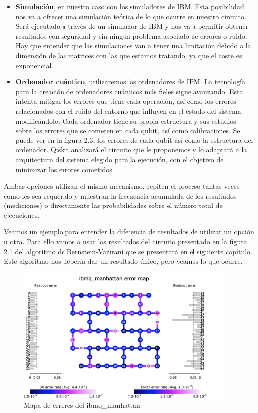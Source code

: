  \begin{itemize}
     \item \textbf{Simulación}, en nuestro caso con los simuladores de IBM. Esta posibilidad nos va a ofrecer una simulación teórica de lo que ocurre en nuestro circuito. Será ejecutado a través de un simulador de IBM y nos va a permitir obtener resultados con seguridad y sin ningún problema asociado de errores o ruido. Hay que entender que las simulaciones van a tener una limitación debido a la dimensión de las matrices con las que estamos tratando, ya que el coste es exponencial.
     
     \item \textbf{Ordenador cuántico}, utilizaremos los ordenadores de IBM. La tecnología para la creación de ordenadores cuánticos más fieles sigue avanzando. Esta intenta mitigar los errores que tiene cada operación, así como los errores relacionados con el ruido del entorno que influyen en el estado del sistema modificándolo. Cada ordenador tiene su propia estructura y sus estudios sobre los errores que se cometen en cada qubit, así como calibraciones. Se puede ver en la figura 2.3, los errores de cada qubit así como la estructura del ordenador. Qiskit analizará el circuito que le proponemos y lo adaptará a la arquitectura del sistema elegido para la ejecución, con el objetivo de minimizar los errores cometidos.
     
 \end{itemize}


 Ambas opciones utilizan el mismo mecanismo, repiten el proceso tantas veces como les sea requerido y muestran la frecuencia acumulada de los resultados (mediciones) o directamente las probabilidades sobre el número total de ejecuciones. \newline

 Veamos un ejemplo para entender la diferencia de resultados de utilizar un opción u otra. Para ello vamos a usar los resultados del circuito presentado en la figura 2.1 del algoritmo de Bernstein-Vazirani que se presentará en el siguiente capítulo. Este algoritmo nos debería dar un resultado único, pero veamos lo que ocurre. \newline
 

  \begin{figure}[H]
    \centering
    \includegraphics[width=0.95\textwidth]{TFG/imagenes/system_error_manhattan.png}
    \caption{Mapa de errores del ibmq\_manhattan} 
 \end{figure}

